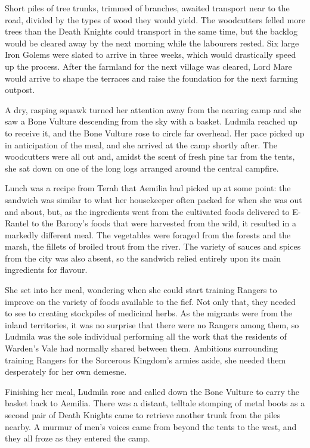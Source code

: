  

Short piles of tree trunks, trimmed of branches, awaited transport near to the road, divided by the types of wood they would yield. The woodcutters felled more trees than the Death Knights could transport in the same time, but the backlog would be cleared away by the next morning while the labourers rested. Six large Iron Golems were slated to arrive in three weeks, which would drastically speed up the process. After the farmland for the next village was cleared, Lord Mare would arrive to shape the terraces and raise the foundation for the next farming outpost.

 

A dry, rasping squawk turned her attention away from the nearing camp and she saw a Bone Vulture descending from the sky with a basket. Ludmila reached up to receive it, and the Bone Vulture rose to circle far overhead. Her pace picked up in anticipation of the meal, and she arrived at the camp shortly after. The woodcutters were all out and, amidst the scent of fresh pine tar from the tents, she sat down on one of the long logs arranged around the central campfire.

 

Lunch was a recipe from Terah that Aemilia had picked up at some point: the sandwich was similar to what her housekeeper often packed for when she was out and about, but, as the ingredients went from the cultivated foods delivered to E-Rantel to the Barony’s foods that were harvested from the wild, it resulted in a markedly different meal. The vegetables were foraged from the forests and the marsh, the fillets of broiled trout from the river. The variety of sauces and spices from the city was also absent, so the sandwich relied entirely upon its main ingredients for flavour.

 

She set into her meal, wondering when she could start training Rangers to improve on the variety of foods available to the fief. Not only that, they needed to see to creating stockpiles of medicinal herbs. As the migrants were from the inland territories, it was no surprise that there were no Rangers among them, so Ludmila was the sole individual performing all the work that the residents of Warden’s Vale had normally shared between them. Ambitions surrounding training Rangers for the Sorcerous Kingdom’s armies aside, she needed them desperately for her own demesne.

 

Finishing her meal, Ludmila rose and called down the Bone Vulture to carry the basket back to Aemilia. There was a distant, telltale stomping of metal boots as a second pair of Death Knights came to retrieve another trunk from the piles nearby. A murmur of men’s voices came from beyond the tents to the west, and they all froze as they entered the camp.

